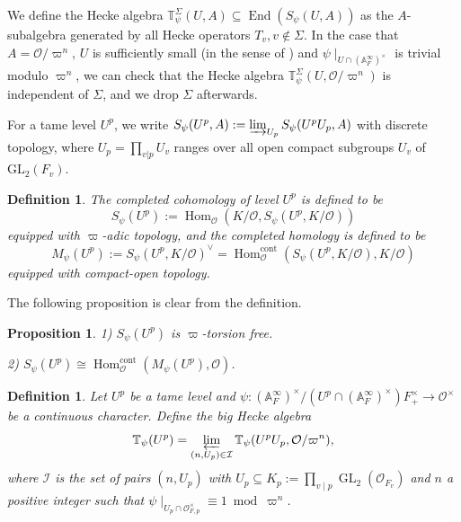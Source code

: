 \documentclass[a4paper, 12pt]{amsart}
\newtheorem{prop}[thm]{Proposition}
\newtheorem{defn}[thm]{Definition} \theoremstyle{remark}
\DeclareMathOperator{\Hom}{Hom}
\def\cont{\mathrm{cont}}
\newcommand{\GL}{\mathrm{GL}}
\newcommand{\cO}{\mathcal{O}}
\begin{document}
    We define the Hecke algebra $\mathbb{T}_{\psi} ^\Sigma (U,A) \subseteq \operatorname{End}(S_{\psi}(U,A))$ as the $A$-subalgebra generated  by all Hecke operators $T_v, v \notin \Sigma$. In the case that $A= \mathcal{O}/ \varpi^n$, $ U$ is sufficiently small (in the sense of \cite[page 1046]{pan2022fontaine}) and $\psi \mid_{U \cap (\mathbb{A}_F^\infty)^\times} $ is trivial modulo $ \varpi^n$, we can check that the Hecke algebra $\mathbb{T}_{\psi}^\Sigma (U, \mathcal{O}/ \varpi^n)$ is independent of $\Sigma$, and we drop $\Sigma$ afterwards.
    
    For a tame level $U^p$, we write $S_{\psi}(U^p,A):=\varinjlim_{U_p} S_\psi(U^pU_p,A) $ with discrete topology, where $U_p=\prod_{v|p}U_v$ ranges over all open compact subgroups $U_v$ of $\GL_2(F_v)$. 

    
    \begin{defn} \label{Completed coh}
    	The \textit{completed cohomology} of level $U^p$ is defined to be
    	\[S_\psi(U^p):=\Hom_\cO(K/\cO,S_{\psi}(U^p,K/\cO))\]
    	equipped with $\varpi$-adic topology, and the \textit{completed homology} is defined to be
    	\[M_\psi(U^p):=S_\psi(U^p,K/\cO)^\vee=\Hom_\cO^{\cont}(S_{\psi}(U^p,K/\cO),K/\cO)\]
    	equipped with compact-open topology.
    \end{defn}
    
    The following proposition is clear from the definition.
    
    \begin{prop}\label{3.1.2}
    	1) $ S_\psi(U^p)$ is $\varpi$-torsion free.
    	
    	2) $ S_\psi(U^p) \cong \Hom^{\mathrm{cont}}_{\cO}(M_\psi(U^p),\cO)$.
    \end{prop}
    
   	\begin{defn} \label{big}
   	Let $U^p$ be a tame level and $\psi: (\mathbb{A}_F^\infty)^\times/ (U^p \cap (\mathbb{A}_F^\infty)^\times)F_+^\times \to \mathcal{O}^\times$ be a continuous character. Define the \textit{big Hecke algebra} $$
   	\mathbb{T}_{\psi}(U^p) = \varprojlim_{(n, U_p) \in \mathcal{I}} \mathbb{T}_{\psi}(U^pU_p, \mathcal{O}/\varpi^n), $$
   	where $\mathcal{I}$ is the set of pairs $(n, U_p)$ with $U_p \subseteq K_p :=\prod_{v \mid p} \operatorname{GL}_2(\cO_{F_v})$ and $n$ a positive integer such that $ \psi \mid_{U_p \cap \mathcal{O}_{F,p}^\times} \equiv 1~ \operatorname{mod}~\varpi^n$.
   	
   \end{defn}
    
\end{document}
